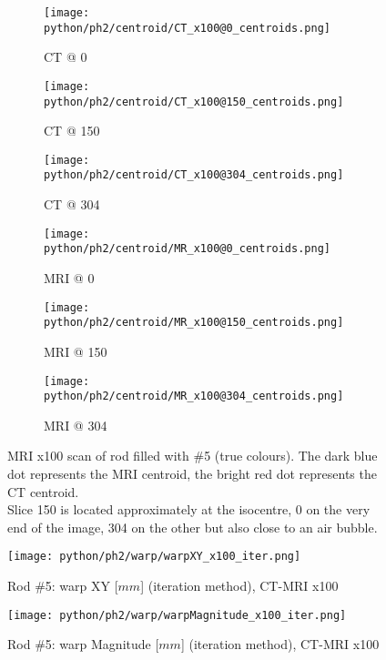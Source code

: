 \begin{figure}[!tbp]
  \begin{subfigure}[b]{0.32\textwidth}
    \texttt{[image: python/ph2/centroid/CT\_x100@0\_centroids.png]}
    \caption{CT @ 0}
    \label{fig:CT_x100_centroids@0}
  \end{subfigure}
  \begin{subfigure}[b]{0.32\textwidth}
    \texttt{[image: python/ph2/centroid/CT\_x100@150\_centroids.png]}
    \caption{CT @ 150}
    \label{fig:CT_x100_centroids@150}
  \end{subfigure}
  \begin{subfigure}[b]{0.32\textwidth}
    \texttt{[image: python/ph2/centroid/CT\_x100@304\_centroids.png]}
    \caption{CT @ 304}
    \label{fig:CT_x100_centroids@304}
  \end{subfigure}
  \begin{subfigure}[b]{0.32\textwidth}
    \texttt{[image: python/ph2/centroid/MR\_x100@0\_centroids.png]}
    \caption{MRI @ 0}
    \label{fig:MR_x100_centroids@0}
  \end{subfigure}
  \begin{subfigure}[b]{0.32\textwidth}
    \texttt{[image: python/ph2/centroid/MR\_x100@150\_centroids.png]}
    \caption{MRI @ 150}
    \label{fig:MR_x100_centroids@150}
  \end{subfigure}
  \begin{subfigure}[b]{0.32\textwidth}
    \texttt{[image: python/ph2/centroid/MR\_x100@304\_centroids.png]}
    \caption{MRI @ 304}
    \label{fig:MR_x100_centroids@304}
  \end{subfigure}
  \caption{MRI x100 scan of rod filled with \#5 (true colours). The dark blue dot represents the MRI centroid, the bright red dot represents the CT centroid.
  			\\ Slice 150 is located approximately at the isocentre, 0 on the very end of the image, 304 on the other but also close to an air bubble.}
  \label{fig:MR_x100_centroids}
\end{figure}


\begin{figure}[!bp]
  \centering
  \texttt{[image: python/ph2/warp/warpXY\_x100\_iter.png]}
  \caption{Rod \#5: warp XY [$mm$] (iteration method), CT-MRI x100}
  \label{fig:ph2_warpXY_x100}
\end{figure}

\begin{figure}[!tp]
    \centering
    \texttt{[image: python/ph2/warp/warpMagnitude\_x100\_iter.png]}
    \caption{Rod \#5: warp Magnitude [$mm$] (iteration method), CT-MRI x100}
    \label{fig:ph2_warpMagnitude_x100}
\end{figure}

